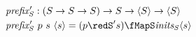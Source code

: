 \documentclass[preview]{standalone}
\begin{document}
\begin{align*}%
    \mathit{prefix'_S} &: (S \rightarrow S \rightarrow S) \rightarrow S \rightarrow \vect{S} \rightarrow \vect{S}\\
    \mathit{prefix'_S} &\ p\ s\ \vect{s} = (p \redS' s) \fMapS \mathit{inits_S} \vect{s}%
\end{align*}
\end{document}
